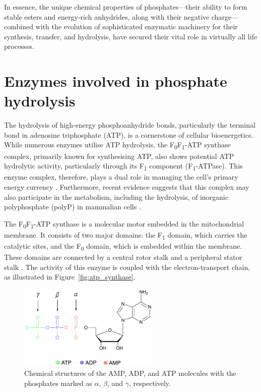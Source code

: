 In essence, the unique chemical properties of phosphates—their ability to form stable esters and energy-rich anhydrides, along with their negative charge—combined with the evolution of sophisticated enzymatic machinery for their synthesis, transfer, and hydrolysis, have secured their vital role in virtually all life processes.



\section{Enzymes involved in phosphate hydrolysis}
The hydrolysis of high-energy phosphoanhydride bonds, particularly the terminal bond in adenosine triphosphate (ATP), is a cornerstone of cellular bioenergetics. While numerous enzymes utilise ATP hydrolysis, the F\textsubscript{0}F\textsubscript{1}-ATP synthase complex, primarily known for synthesising ATP, also shows potential ATP hydrolytic activity, particularly through its F\textsubscript{1} component (F\textsubscript{1}-ATPase). This enzyme complex, therefore, plays a dual role in managing the cell's primary energy currency \citep{bonoraATPSynthesisStorage2012, boyerEnergyLifeATP1998, walkerATPSynthaseUnderstood2013}. Furthermore, recent evidence suggests that this complex may also participate in the metabolism, including the hydrolysis, of inorganic polyphosphate (polyP) in mammalian cells \citep{baevInorganicPolyphosphateF0F1ATP2022, baevInorganicPolyphosphateProduced2020}.

The F\textsubscript{0}F\textsubscript{1}-ATP synthase is a molecular motor embedded in the mitochondrial membrane. It consists of two major domains: the F\textsubscript{1} domain, which carries the catalytic sites, and the F\textsubscript{0} domain, which is embedded within the membrane. These domains are connected by a central rotor stalk and a peripheral stator stalk \citep{walkerATPSynthesisRotary1998, walkerATPSynthaseUnderstood2013, wattBioenergeticCostMaking2010}. The activity of this enzyme is coupled with the electron-transport chain, as illustrated in Figure~\ref{fig:atp_synthase}.

\begin{figure}[t!]
    \centering
    \includegraphics[width=0.6\textwidth]{Figures/1_Introduction/intro_atp.pdf}
    \caption{Chemical structures of the AMP, ADP, and ATP molecules with the phosphates marked as $\alpha$, $\beta$, and $\gamma$, respectively.}
    \label{fig:atp}
\end{figure}

